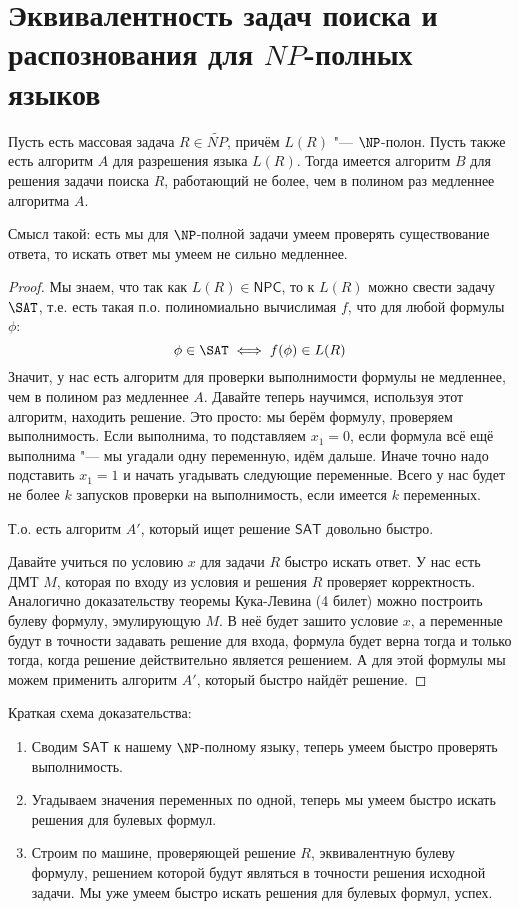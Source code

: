 ﻿\section{Эквивалентность задач поиска и распознования для $NP$-полных языков}
	\begin{theorem}
		Пусть есть массовая задача $R \in \widetilde{NP}$, причём $L(R)$ "--- $\NP$-полон.
		Пусть также есть алгоритм $A$ для разрешения языка $L(R)$.
		Тогда имеется алгоритм $B$ для решения задачи поиска $R$, работающий не более, чем в полином раз медленнее алгоритма $A$.
	\end{theorem}
	\begin{Rem}
		Смысл такой: есть мы для $\NP$-полной задачи умеем проверять существование ответа, то искать ответ мы умеем не сильно медленнее.
	\end{Rem}
	\begin{proof}
		Мы знаем, что так как $L(R) \in \mathsf{NPC}$, то к $L(R)$ можно свести задачу $\SAT$,
		т.е. есть такая п.о. полиномиально вычислимая $f$, что для любой формулы $\phi$:
		\[ \phi \in \SAT \iff f(\phi) \in L(R) \]
		Значит, у нас есть алгоритм для проверки выполнимости формулы не медленнее, чем в полином раз медленнее $A$.
		Давайте теперь научимся, используя этот алгоритм, находить решение.
		Это просто: мы берём формулу, проверяем выполнимость.
		Если выполнима, то подставляем $x_1=0$, если формула всё ещё выполнима "--- мы угадали одну переменную, идём дальше.
		Иначе точно надо подставить $x_1=1$ и начать угадывать следующие переменные.
		Всего у нас будет не более $k$ запусков проверки на выполнимость, если имеется $k$ переменных.

		Т.о. есть алгоритм $A'$, который ищет решение $\mathsf{SAT}$ довольно быстро.

		Давайте учиться по условию $x$ для задачи $R$ быстро искать ответ.
		У нас есть ДМТ $M$, которая по входу из условия и решения $R$ проверяет корректность.
		Аналогично доказательству теоремы Кука-Левина (4 билет) можно построить булеву формулу, эмулирующую $M$.
		В неё будет зашито условие $x$, а переменные будут в точности задавать решение для входа, формула
		будет верна тогда и только тогда, когда решение действительно является решением.
		А для этой формулы мы можем применить алгоритм $A'$, который быстро найдёт решение.
	\end{proof}
	\begin{Rem}
		Краткая схема доказательства:
		\begin{enumerate}
			\item Сводим $\mathsf{SAT}$ к нашему $\NP$-полному языку, теперь умеем быстро проверять выполнимость.
			\item Угадываем значения переменных по одной, теперь мы умеем быстро искать решения для булевых формул.
			\item Строим по машине, проверяющей решение $R$, эквивалентную булеву формулу, решением которой будут являться в точности решения исходной задачи.
				Мы уже умеем быстро искать решения для булевых формул, успех.
		\end{enumerate}
	\end{Rem}
